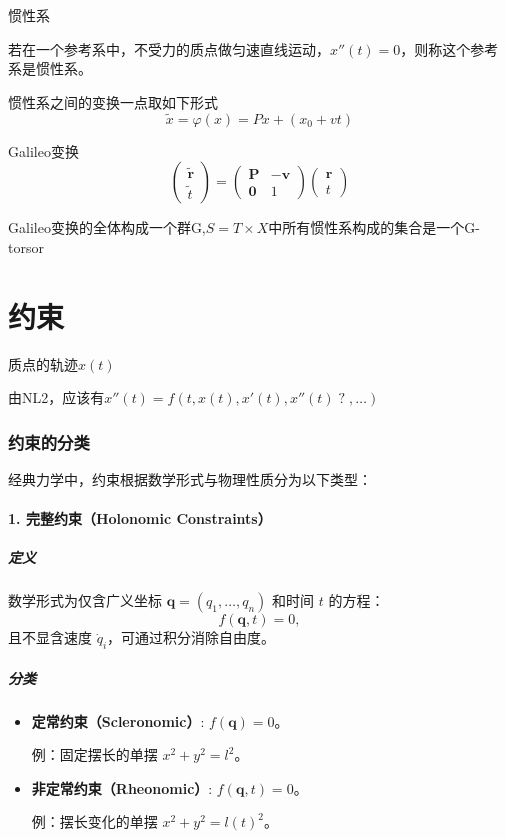 \documentclass[12pt, a4paper, oneside, UTF8]{ctexbook}  %
\begin{document}
\begin{defn}
    惯性系

    若在一个参考系中，不受力的质点做匀速直线运动，$x''(t)=0$，则称这个参考系是惯性系。
\end{defn}
\begin{thm}
    惯性系之间的变换一点取如下形式
    \[\tilde{x}=\varphi(x)=Px+(x_0+vt)\]
\end{thm}
\begin{corollary}
    Galileo变换
    \[
\begin{pmatrix}
\tilde{\mathbf{r}} \\
\tilde{t}
\end{pmatrix}=
\begin{pmatrix}
\mathbf{P} & -\mathbf{v} \\
\mathbf{0} & 1
\end{pmatrix}
\begin{pmatrix}
\mathbf{r} \\
t
\end{pmatrix}
\]
\end{corollary}
\begin{add}
    Galileo变换的全体构成一个群G,\(S=T\times X\)中所有惯性系构成的集合是一个G-torsor
\end{add}
\section{约束}
\begin{proposition}
    质点的轨迹$x(t)$

    由NL2，应该有\(x''(t)=f(t,x(t),x'(t),x''(t)\;?\;,\dots)\)
\end{proposition}
\subsubsection*{约束的分类}
经典力学中，约束根据数学形式与物理性质分为以下类型：

\paragraph*{1. 完整约束（Holonomic Constraints）}
\subparagraph*{定义}
数学形式为仅含广义坐标 \(\mathbf{q} = (q_1, \dots, q_n)\) 和时间 \(t\) 的方程：
\begin{equation}
    f(\mathbf{q}, t) = 0,
\end{equation}
且不显含速度 \(\dot{q}_i\)，可通过积分消除自由度。

\subparagraph*{分类}
\begin{itemize}
    \item \textbf{定常约束（Scleronomic）}: \( f(\mathbf{q}) = 0 \)。\par
    例：固定摆长的单摆 \( x^2 + y^2 = l^2 \)。
    \item \textbf{非定常约束（Rheonomic）}: \( f(\mathbf{q}, t) = 0 \)。\par
    例：摆长变化的单摆 \( x^2 + y^2 = l(t)^2 \)。
\end{itemize}
\end{document}
